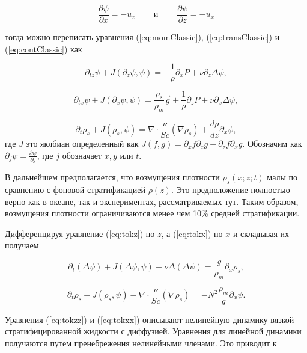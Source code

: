 \begin{equation}
    \frac{\partial \psi}{\partial x} = - u_z \;\;\;\;\;\;\;\; и \;\;\;\;\;\;\;\; \frac{\partial \psi}{\partial z} = - u_x
\end{equation}

тогда можно переписать уравнения (\ref{eq:momClassic}), (\ref{eq:transClassic}) и (\ref{eq:contClassic}) как

\begin{equation}
    \partial_{tz} \psi + J(\partial_z \psi, \psi) = - \frac{1}{\rho} \partial_x P + \nu \partial_z \Delta \psi,
    \label{eq:tokz}
\end{equation}

\begin{equation}
    \partial_{tx} \psi + J(\partial_x \psi, \psi) = \frac{\rho_s}{\rho_m}\vec{g}+\frac{1}{\rho}\partial_z P + \nu \partial_x \Delta \psi,
    \label{eq:tokx}
\end{equation}

\begin{equation}
    \partial_t \rho_s + J(\rho_s,\psi) = \nabla \cdot \frac{\nu}{Sc} (\nabla \rho_s) + \frac{d \rho}{dz} \partial_x \psi,
\end{equation}
где $J$ это яклбиан определенный как $J(f,g) = \partial_x f \partial_z g - \partial_z f \partial_x g.$ Обозначим как $\partial_j \psi =\frac{\partial \psi}{\partial j}$, где $j$ обозначает $x,y$ или $t$. 

В дальнейшем предполагается, что возмущения плотности $\rho_s(x; z; t)$ малы по сравнению с фоновой стратификацией $\rho(z)$. Это предположение полностью верно как в океане, так и экспериментах, рассматриваемых тут. Таким образом, возмущения плотности ограничиваются менее чем 10\% средней стратификации. 

Дифференцируя уравнение (\ref{eq:tokz}) по $z$, а (\ref{eq:tokx}) по $x$ и складывая их получаем

\begin{equation}
    \partial_t(\Delta \psi) + J (\Delta \psi, \psi) - \nu \Delta (\Delta \psi) = \frac{g}{\rho_m} \partial_x \rho_s,
    \label{eq:tokzz}
\end{equation}

\begin{equation}
    \partial_t \rho_s + J(\rho_s,\psi) - \nabla \cdot \frac{\nu}{Sc} (\nabla \rho_s) = -N^2 \frac{\rho_m}{g}\partial_x \psi.
    \label{eq:tokxx}
\end{equation}

Уравнения (\ref{eq:tokzz}) и (\ref{eq:tokxx}) описывают нелинейную динамику вязкой стратифицированной жидкости с диффузией. Уравнения для линейной динамики получаются путем пренебрежения нелинейными членами. Это приводит к

